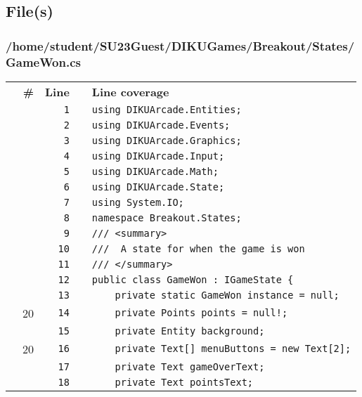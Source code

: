 \documentclass[a4paper,landscape,10pt]{article}
\begin{document}
\subsection{File(s)}
\subsubsection{/home/student/SU23Guest/DIKUGames/Breakout/States/GameWon.cs}
\begin{longtable}[l]{lrrll}
\textbf{} & \textbf{\#} & \textbf{Line} & \textbf{} & \textbf{Line coverage}\\
\cellcolor{gray} &  & \verb~1~ & & \verb~using DIKUArcade.Entities;~\\
\cellcolor{gray} &  & \verb~2~ & & \verb~using DIKUArcade.Events;~\\
\cellcolor{gray} &  & \verb~3~ & & \verb~using DIKUArcade.Graphics;~\\
\cellcolor{gray} &  & \verb~4~ & & \verb~using DIKUArcade.Input;~\\
\cellcolor{gray} &  & \verb~5~ & & \verb~using DIKUArcade.Math;~\\
\cellcolor{gray} &  & \verb~6~ & & \verb~using DIKUArcade.State;~\\
\cellcolor{gray} &  & \verb~7~ & & \verb~using System.IO;~\\
\cellcolor{gray} &  & \verb~8~ & & \verb~namespace Breakout.States;~\\
\cellcolor{gray} &  & \verb~9~ & & \verb~/// <summary>~\\
\cellcolor{gray} &  & \verb~10~ & & \verb~///  A state for when the game is won~\\
\cellcolor{gray} &  & \verb~11~ & & \verb~/// </summary>~\\
\cellcolor{gray} &  & \verb~12~ & & \verb~public class GameWon : IGameState {~\\
\cellcolor{gray} &  & \verb~13~ & & \verb~    private static GameWon instance = null;~\\
\cellcolor{green} & 20 & \verb~14~ & & \verb~    private Points points = null!;~\\
\cellcolor{gray} &  & \verb~15~ & & \verb~    private Entity background;~\\
\cellcolor{green} & 20 & \verb~16~ & & \verb~    private Text[] menuButtons = new Text[2];~\\
\cellcolor{gray} &  & \verb~17~ & & \verb~    private Text gameOverText;~\\
\cellcolor{gray} &  & \verb~18~ & & \verb~    private Text pointsText;~\\

\end{longtable}
\end{document}
